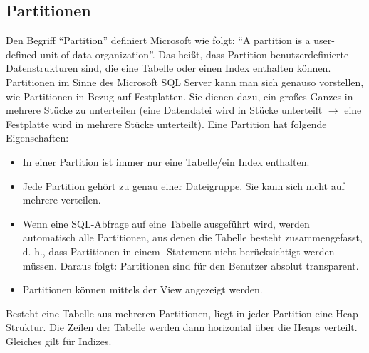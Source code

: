       \subsection{Partitionen}
        Den Begriff \enquote{Partition} definiert Microsoft wie folgt:
        \enquote{A partition is a user-defined unit of data organization}.
        Das heißt, dass Partition benutzerdefinierte Datenstrukturen sind, die
        eine Tabelle oder einen Index enthalten können. Partitionen im Sinne
        des Microsoft SQL Server kann man sich genauso vorstellen, wie
        Partitionen in Bezug auf Festplatten. Sie dienen dazu, ein großes
        Ganzes in mehrere Stücke zu unterteilen (eine Datendatei wird in
        Stücke unterteilt $\rightarrow$ eine Festplatte wird in mehrere Stücke
        unterteilt). Eine Partition hat folgende Eigenschaften:
        \begin{itemize}
          \item In einer Partition ist immer nur eine Tabelle/ein Index
          enthalten.
          \item Jede Partition gehört zu genau einer Dateigruppe. Sie kann
          sich nicht auf mehrere verteilen.
          \item Wenn eine SQL-Abfrage auf eine Tabelle ausgeführt wird, werden
          automatisch alle Partitionen, aus denen die Tabelle besteht
          zusammengefasst, d. h., dass Partitionen in einem \SELECT-Statement
          nicht berücksichtigt werden müssen. Daraus folgt: Partitionen sind
          für den Benutzer absolut transparent.
          \item Partitionen können mittels der View
           angezeigt werden.
        \end{itemize}
        \begin{merke}
          Besteht eine Tabelle aus mehreren Partitionen, liegt in jeder
          Partition eine Heap-Struktur. Die Zeilen der Tabelle werden dann
          horizontal über die Heaps verteilt. Gleiches gilt für Indizes.
        \end{merke}
